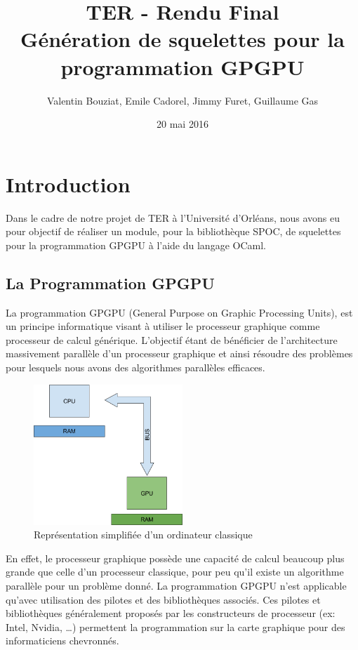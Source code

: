 \documentclass{report}
\title{TER - Rendu Final \\ Génération de squelettes pour la programmation GPGPU}
\author{Valentin Bouziat, Emile Cadorel, Jimmy Furet, Guillaume Gas}
\date{20 mai 2016}
\begin{document}
\maketitle

\chapter{Introduction}
Dans le cadre de notre projet de TER à l’Université d’Orléans, nous avons eu pour objectif de réaliser un module, pour la bibliothèque SPOC, de squelettes pour la programmation GPGPU à l’aide du langage OCaml.

\section{La Programmation GPGPU}
La programmation GPGPU\cite{refProgGPGPU} (General Purpose on Graphic Processing Units), est un principe informatique visant à utiliser le processeur graphique comme processeur de calcul générique. L’objectif étant de bénéficier de l’architecture massivement parallèle d’un processeur graphique et ainsi résoudre des problèmes pour lesquels nous avons des algorithmes parallèles efficaces.\newline \newline

\begin{figure}[!h]
\begin{center}
\includegraphics[height=150pt]{images_finales/image1.png}
\end{center}
\caption{Représentation simplifiée d'un ordinateur classique}
\label{test1}
\end{figure}

En effet, le processeur graphique possède une capacité de calcul beaucoup plus grande que celle d’un processeur classique, pour peu qu’il existe un algorithme parallèle pour un problème donné. La programmation GPGPU n’est applicable qu’avec utilisation des pilotes et des bibliothèques associés. Ces pilotes et bibliothèques généralement proposés par les constructeurs de processeur (ex: Intel, Nvidia, …) permettent la programmation sur la carte graphique pour des informaticiens chevronnés.\newline 
\end{document}

